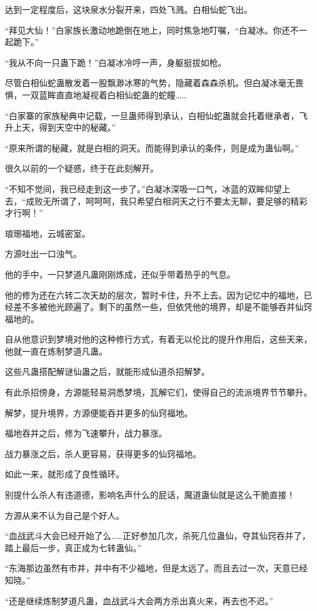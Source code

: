 \begin{this_body}
达到一定程度后，这块泉水分裂开来，四处飞溅。白相仙蛇飞出。

“拜见大仙！”白家族长激动地跪倒在地上，同时焦急地叮嘱，“白凝冰。你还不一起跪下。”

“我从不向一只蛊下跪！”白凝冰冷哼一声，身躯挺拔如枪。

尽管白相仙蛇蛊散发着一股飘渺冰寒的气势，隐藏着森森杀机。但白凝冰毫无畏惧，一双蓝眸直直地凝视着白相仙蛇蛊的蛇瞳……

“白家寨的家族秘典中记载，一旦蛊师得到承认，白相仙蛇蛊就会托着继承者，飞升上天，得到天空中的秘藏。”

“原来所谓的秘藏，就是白相的洞天。而能得到承认的条件，则是成为蛊仙啊。”

很久以前的一个疑惑，终于在此刻解开。

“不知不觉间，我已经走到这一步了。”白凝冰深吸一口气，冰蓝的双眸仰望上去，“成败无所谓了，呵呵呵，我只希望白相洞天之行不要太无聊，要足够的精彩才行啊！”

琅琊福地，云城密室。

方源吐出一口浊气。

他的手中，一只梦道凡蛊刚刚炼成，还似乎带着热乎的气息。

他的修为还在六转二次天劫的层次，暂时卡住，升不上去。因为记忆中的福地，已经差不多被他光顾遍了。剩下的虽然一些，但依凭他的境界，却是不能够吞并仙窍福地的。

自从他意识到梦境对他的这种修行方式，有着无以伦比的提升作用后，这些天来，他就一直在炼制梦道凡蛊。

这些凡蛊搭配解谜仙蛊之后，就能形成仙道杀招解梦。

有此杀招傍身，方源能轻易洞悉梦境，瓦解它们，使得自己的流派境界节节攀升。

解梦，提升境界，方源便能吞并更多的仙窍福地。

福地吞并之后，修为飞速攀升，战力暴涨。

战力暴涨之后，杀人更容易，获得更多的仙窍福地。

如此一来，就形成了良性循环。

别提什么杀人有违道德，影响名声什么的屁话，魔道蛊仙就是这么干脆直接！

方源从来不认为自己是个好人。

“血战武斗大会已经开始了么……正好参加几次，杀死几位蛊仙，夺其仙窍吞并了，踏上最后一步，真正成为七转蛊仙。”

“东海那边虽然有市井，井中有不少福地，但是太远了。而且去过一次，天意已经知晓。”

“还是继续炼制梦道凡蛊，血战武斗大会两方杀出真火来，再去也不迟。”


\end{this_body}
